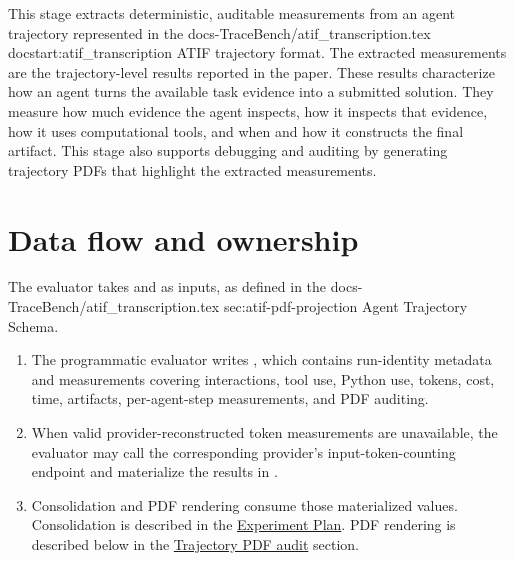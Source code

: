 \documentclass[11pt]{article}
\begin{document}
\label{docstart:agentic_trajectory_evaluation}

This stage extracts deterministic, auditable measurements from an agent trajectory represented in the
\TexLink
  {docs-TraceBench/atif_transcription.tex}
  {docstart:atif_transcription}
  {ATIF trajectory format}.
The extracted measurements are the trajectory-level results reported in the paper.
These results characterize how an agent turns the available task evidence into a submitted solution.
They measure how much evidence the agent inspects, how it inspects that evidence, how it uses computational tools, and when and how it constructs the final artifact.
This stage also supports debugging and auditing by generating trajectory PDFs that highlight the extracted measurements.


\section*{Data flow and ownership}

The evaluator takes  and  as inputs, as defined in the
\TexLink
  {docs-TraceBench/atif_transcription.tex}
  {sec:atif-pdf-projection}
  {Agent Trajectory Schema}.
\begin{enumerate}
  \item The programmatic evaluator writes , which contains run-identity metadata and measurements covering interactions, tool use, Python use, tokens, cost, time, artifacts, per-agent-step measurements, and PDF auditing.
  \item When valid provider-reconstructed token measurements are unavailable, the evaluator may call the corresponding provider's input-token-counting endpoint and materialize the results in .
  \item Consolidation and PDF rendering consume those materialized values.
  Consolidation is described in the \href{experiment_plan.pdf}{Experiment Plan}.
  PDF rendering is described below in the \hyperref[docstart:trajectory_pdf_visualiser]{Trajectory PDF audit} section.
\end{enumerate}
\end{document}
